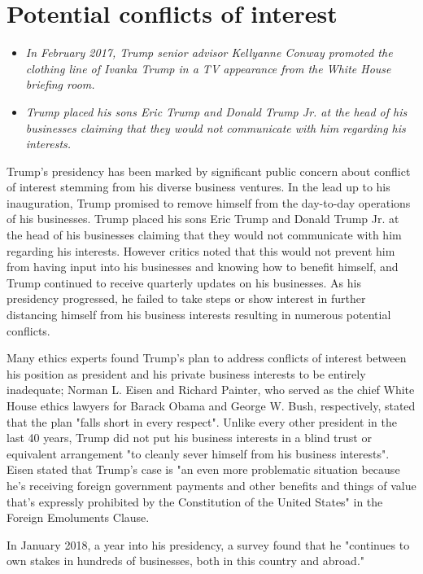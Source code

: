 \section{Potential conflicts of
interest}\label{potential-conflicts-of-interest}

\begin{itemize}
\item
  \emph{In February 2017, Trump senior advisor Kellyanne Conway promoted
  the clothing line of Ivanka Trump in a TV appearance from the White
  House briefing room.}
\item
  \emph{Trump placed his sons Eric Trump and Donald Trump Jr. at the
  head of his businesses claiming that they would not communicate with
  him regarding his interests.}
\end{itemize}

Trump's presidency has been marked by significant public concern about
conflict of interest stemming from his diverse business ventures. In the
lead up to his inauguration, Trump promised to remove himself from the
day-to-day operations of his businesses. Trump placed his sons Eric
Trump and Donald Trump Jr. at the head of his businesses claiming that
they would not communicate with him regarding his interests. However
critics noted that this would not prevent him from having input into his
businesses and knowing how to benefit himself, and Trump continued to
receive quarterly updates on his businesses. As his presidency
progressed, he failed to take steps or show interest in further
distancing himself from his business interests resulting in numerous
potential conflicts.

Many ethics experts found Trump's plan to address conflicts of interest
between his position as president and his private business interests to
be entirely inadequate; Norman L. Eisen and Richard Painter, who served
as the chief White House ethics lawyers for Barack Obama and George W.
Bush, respectively, stated that the plan "falls short in every respect".
Unlike every other president in the last 40 years, Trump did not put his
business interests in a blind trust or equivalent arrangement "to
cleanly sever himself from his business interests". Eisen stated that
Trump's case is "an even more problematic situation because he's
receiving foreign government payments and other benefits and things of
value that's expressly prohibited by the Constitution of the United
States" in the Foreign Emoluments Clause.

In January 2018, a year into his presidency, a survey found that he
"continues to own stakes in hundreds of businesses, both in this country
and abroad."

